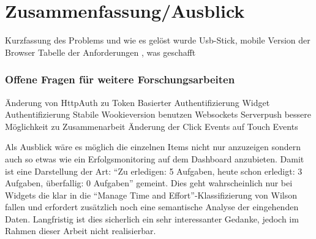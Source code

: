 \chapter{Zusammenfassung/Ausblick} 
\label{chapter:Kapitel7}
Kurzfassung des Problems und wie es gelöst wurde
Usb-Stick, mobile Version der Browser
Tabelle der Anforderungen , was geschafft


\subsection{Offene Fragen für weitere Forschungsarbeiten}
Änderung von HttpAuth zu Token Basierter Authentifizierung
Widget Authentifizierung
Stabile Wookieversion benutzen
Websockets
Serverpush
bessere Möglichkeit zu Zusammenarbeit
Änderung der Click Events auf Touch Events

Als Ausblick wäre es möglich die einzelnen Items nicht nur anzuzeigen sondern auch so etwas wie ein Erfolgsmonitoring auf dem Dashboard anzubieten. Damit ist eine Darstellung der Art: “Zu erledigen: 5 Aufgaben, heute schon erledigt: 3 Aufgaben, überfallig: 0 Aufgaben” gemeint. Dies geht wahrscheinlich nur bei Widgets die klar in die “Manage Time and Effort”-Klassifizierung von Wilson fallen und erfordert zusätzlich noch eine semantische Analyse der eingehenden Daten. Langfristig ist dies sicherlich ein sehr interessanter Gedanke, jedoch im Rahmen dieser Arbeit nicht realisierbar.



